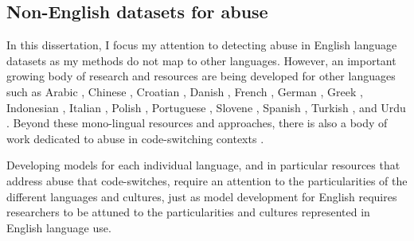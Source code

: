 \subsection{Non-English datasets for abuse}

In this dissertation, I focus my attention to detecting abuse in English language datasets as my methods do not map to other languages. However, an important growing body of research and resources are being developed for other languages such as Arabic \citep{Arabic abuse papers}, Chinese \citep{Chinese abuse papers}, Croatian \citep{Croatian papers}, Danish \citep{Danish abuse data}, French \citep{French papers}, German \citep{German papers}, Greek \citep{Greek papers}, Indonesian \citep{Indonesian papers}, Italian \citep{Italian papers}, Polish \citep{Polish papers}, Portuguese \citep{Portuguese papers}, Slovene \citep{Slovenian papers}, Spanish \citep{Spanish papers}, Turkish \citep{Turkish papers}, and Urdu \citep{Urdu papers}. Beyond these mono-lingual resources and approaches, there is also a body of work dedicated to abuse in code-switching contexts \citep{Code switching papers}.

Developing models for each individual language, and in particular resources that address abuse that code-switches, require an attention to the particularities of the different languages and cultures, just as model development for English requires researchers to be attuned to the particularities and cultures represented in English language use.




